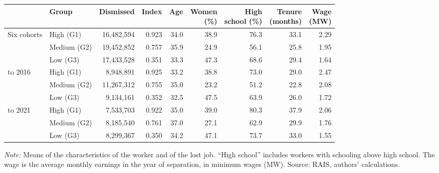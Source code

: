 {\footnotesize
\begin{threeparttable}
\begin{tabular}{llrrrrrrr}
\toprule
 & Group & Dismissed & Index & Age & \shortstack{Women\\(\%)} & \shortstack{High\\school (\%)} & \shortstack{Tenure\\(months)} & \shortstack{Wage\\(MW)} \\
\midrule
Six cohorts & High (G1) & 16,482,594 & 0.923 & 34.0 & 38.9 & 76.3 & 33.1 & 2.29 \\
 & Medium (G2) & 19,452,852 & 0.757 & 35.9 & 24.9 & 56.1 & 25.8 & 1.95 \\
 & Low (G3) & 17,433,528 & 0.351 & 33.3 & 47.3 & 68.6 & 29.4 & 1.64 \\
\addlinespace[3pt]
2014 to 2016 & High (G1) & 8,948,891 & 0.925 & 33.2 & 38.8 & 73.0 & 29.0 & 2.47 \\
 & Medium (G2) & 11,267,312 & 0.755 & 35.0 & 23.2 & 51.2 & 22.8 & 2.08 \\
 & Low (G3) & 9,134,161 & 0.352 & 32.5 & 47.5 & 63.9 & 26.0 & 1.72 \\
\addlinespace[3pt]
2019 to 2021 & High (G1) & 7,533,703 & 0.922 & 35.0 & 39.0 & 80.3 & 37.9 & 2.06 \\
 & Medium (G2) & 8,185,540 & 0.761 & 37.0 & 27.1 & 62.9 & 29.9 & 1.76 \\
 & Low (G3) & 8,299,367 & 0.350 & 34.2 & 47.1 & 73.7 & 33.0 & 1.55 \\
\bottomrule
\end{tabular}
\begin{tablenotes}[flushleft]\footnotesize
\item \textit{Note:} Means of the characteristics of the worker and of the lost job. ``High school'' includes workers with schooling above high school. The wage is the average monthly earnings in the year of separation, in minimum wages (MW). Source: RAIS, authors' calculations.
\end{tablenotes}
\end{threeparttable}
}
